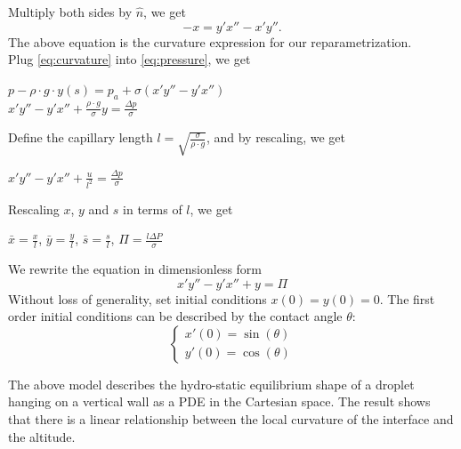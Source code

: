 \documentclass{jfm}
\begin{document}
    Multiply both sides by $\hat{n}$, we get\\
    \begin{equation}
        -x=y'x''-x'y''. 
        \label{eq:curvature}
    \end{equation}
    The above equation is the curvature expression for our reparametrization.\\
    Plug \ref{eq:curvature} into \ref{eq:pressure}, we get\\
    \begin{center}
        $p-\rho\cdot{g}\cdot{y(s)}=p_{a}+\sigma(x'y''-y'x'')$\\
        $x'y''-y'x''+\frac{\rho\cdot{g}}{\sigma}y=\frac{\Delta{p}}{\sigma}$
    \end{center}
    Define the capillary length $l=\sqrt{\frac{\sigma}{\rho\cdot{g}}}$,
    and by rescaling, we get\\
    \begin{center}
        $x'y''-y'x''+\frac{u}{l^2}=\frac{\Delta{p}}{\sigma}$
    \end{center}
    Rescaling $x$, $y$ and $s$ in terms of $l$, we get\\
    \begin{center}
        $\bar{x}=\frac{x}{l}$, $\bar{y}=\frac{y}{l}$, $\bar{s}=\frac{s}{l}$, $\Pi=\frac{l\Delta P}{\sigma}$
    \end{center}
    We rewrite the equation in dimensionless form\\
    \begin{equation}
        x'y''-y'x''+y=\Pi
    \end{equation}
    Without loss of generality, set initial conditions $x(0)=y(0)=0$. The first order initial conditions can be described by the contact angle $\theta$: 
    \begin{equation}
        \begin{cases}
            x'(0)=\sin(\theta)\\
            y'(0)=\cos(\theta)
        \end{cases}
    \end{equation}
    
    The above model describes the hydro-static equilibrium shape of a droplet hanging on a vertical wall as a PDE in the Cartesian space. The result shows that there is a linear relationship between the local curvature of the interface and the altitude. 



\end{document}

